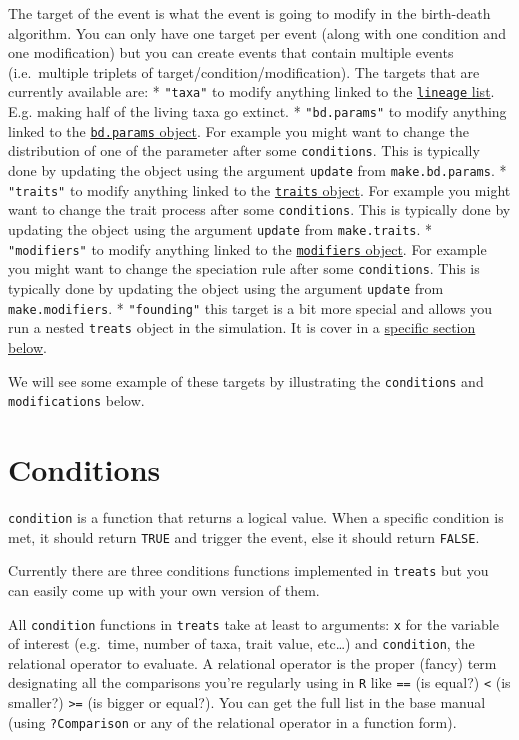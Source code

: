 \documentclass[
]{book}
\begin{document}
The target of the event is what the event is going to modify in the birth-death algorithm.
You can only have one target per event (along with one condition and one modification) but you can create events that contain multiple events (i.e.~multiple triplets of target/condition/modification).
The targets that are currently available are:
* \texttt{"taxa"} to modify anything linked to the \protect\hyperlink{allowarguments}{\texttt{lineage} list}. E.g. making half of the living taxa go extinct.
* \texttt{"bd.params"} to modify anything linked to the \protect\hyperlink{makebdparams}{\texttt{bd.params} object}. For example you might want to change the distribution of one of the parameter after some \texttt{conditions}. This is typically done by updating the object using the argument \texttt{update} from \texttt{make.bd.params}.
* \texttt{"traits"} to modify anything linked to the \protect\hyperlink{maketraits}{\texttt{traits} object}. For example you might want to change the trait process after some \texttt{conditions}. This is typically done by updating the object using the argument \texttt{update} from \texttt{make.traits}.
* \texttt{"modifiers"} to modify anything linked to the \protect\hyperlink{makebdmodifiers}{\texttt{modifiers} object}. For example you might want to change the speciation rule after some \texttt{conditions}. This is typically done by updating the object using the argument \texttt{update} from \texttt{make.modifiers}.
* \texttt{"founding"} this target is a bit more special and allows you run a nested \texttt{treats} object in the simulation. It is cover in a \protect\hyperlink{founding}{specific section below}.

We will see some example of these targets by illustrating the \texttt{conditions} and \texttt{modifications} below.

\hypertarget{conditions}{%
\section{Conditions}\label{conditions}}

\texttt{condition} is a function that returns a logical value. When a specific condition is met, it should return \texttt{TRUE} and trigger the event, else it should return \texttt{FALSE}.

Currently there are three conditions functions implemented in \texttt{treats} but you can easily come up with your own version of them.

All \texttt{condition} functions in \texttt{treats} take at least to arguments: \texttt{x} for the variable of interest (e.g.~time, number of taxa, trait value, etc\ldots) and \texttt{condition}, the relational operator to evaluate. A relational operator is the proper (fancy) term designating all the comparisons you're regularly using in \texttt{R} like \texttt{==} (is equal?) \texttt{\textless{}} (is smaller?) \texttt{\textgreater{}=} (is bigger or equal?). You can get the full list in the base manual (using \texttt{?Comparison} or any of the relational operator in a function form).
\end{document}
